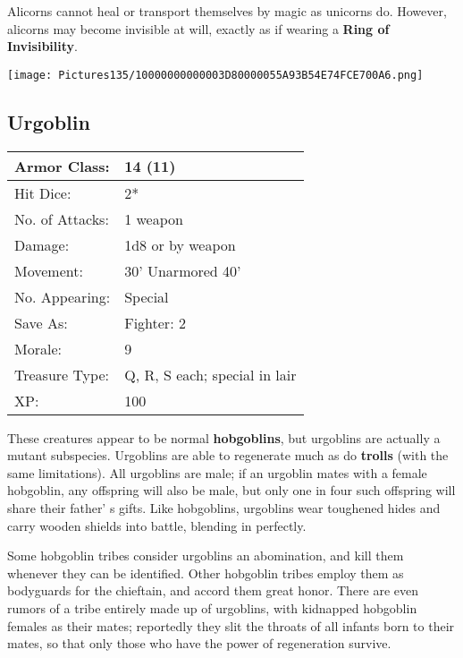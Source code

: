 \documentclass[a4paper,twoside,openany,10pt]{book}
\begin{document}
\begin{multicols}{2}
Alicorns cannot heal or transport themselves by magic as unicorns do. However, alicorns may become invisible at will, exactly as if wearing a \textbf{Ring of Invisibility}.

\begin{center} \texttt{[image: Pictures135/10000000000003D80000055A93B54E74FCE700A6.png]} \end{center}


\subsection*{Urgoblin}\label{urgoblin}

\begin{tabularx}{0.50\textwidth}{@{}lX@{}}
Armor Class: & 14 (11) \\\hline
Hit Dice: & 2* \\\hline
No. of Attacks: & 1 weapon \\\hline
Damage: & 1d8 or by weapon \\\hline
Movement: & 30' Unarmored 40' \\\hline
No. Appearing: & Special \\\hline
Save As: & Fighter: 2 \\\hline
Morale: & 9 \\\hline
Treasure Type: & Q, R, S each; special in lair \\\hline
XP: & 100 \\\hline
\end{tabularx}\medskip

These creatures appear to be normal \textbf{hobgoblins}, but urgoblins are actually a mutant subspecies. Urgoblins are able to regenerate much as do \textbf{trolls} (with the same limitations). All urgoblins are male; if an urgoblin mates with a female hobgoblin, any offspring will also be male, but only one in four such offspring will share their father' s gifts. Like hobgoblins, urgoblins wear toughened hides and carry wooden shields into battle, blending in perfectly.

Some hobgoblin tribes consider urgoblins an abomination, and kill them whenever they can be identified. Other hobgoblin tribes employ them as bodyguards for the chieftain, and accord them great honor. There are even rumors of a tribe entirely made up of urgoblins, with kidnapped hobgoblin females as their mates; reportedly they slit the throats of all infants born to their mates, so that only those who have the power of regeneration survive.


\end{multicols}
\end{document}
